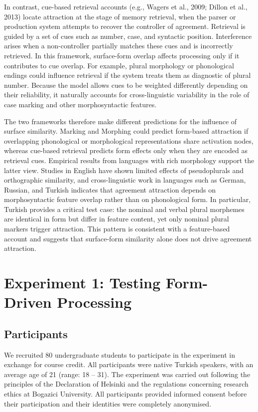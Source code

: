 \documentclass[
  authoryear,
  3p]{elsarticle}
\begin{document}
In contrast, cue-based retrieval accounts (e.g., Wagers et al., 2009;
Dillon et al., 2013) locate attraction at the stage of memory retrieval,
when the parser or production system attempts to recover the controller
of agreement. Retrieval is guided by a set of cues such as number, case,
and syntactic position. Interference arises when a non-controller
partially matches these cues and is incorrectly retrieved. In this
framework, surface-form overlap affects processing only if it
contributes to cue overlap. For example, plural morphology or
phonological endings could influence retrieval if the system treats them
as diagnostic of plural number. Because the model allows cues to be
weighted differently depending on their reliability, it naturally
accounts for cross-linguistic variability in the role of case marking
and other morphosyntactic features.

The two frameworks therefore make different predictions for the
influence of surface similarity. Marking and Morphing could predict
form-based attraction if overlapping phonological or morphological
representations share activation nodes, whereas cue-based retrieval
predicts form effects only when they are encoded as retrieval cues.
Empirical results from languages with rich morphology support the latter
view. Studies in English have shown limited effects of pseudoplurals and
orthographic similarity, and cross-linguistic work in languages such as
German, Russian, and Turkish indicates that agreement attraction depends
on morphosyntactic feature overlap rather than on phonological form. In
particular, Turkish provides a critical test case: the nominal and
verbal plural morphemes are identical in form but differ in feature
content, yet only nominal plural markers trigger attraction. This
pattern is consistent with a feature-based account and suggests that
surface-form similarity alone does not drive agreement attraction.

\section{Experiment 1: Testing Form-Driven
Processing}\label{experiment-1-testing-form-driven-processing}

\subsection{Participants}\label{participants}

We recruited 80 undergraduate students to participate in the experiment
in exchange for course credit. All participants were native Turkish
speakers, with an average age of 21 (range: 18 -- 31). The experiment
was carried out following the principles of the Declaration of Helsinki
and the regulations concerning research ethics at Bogazici University.
All participants provided informed consent before their participation
and their identities were completely anonymised.
\end{document}
